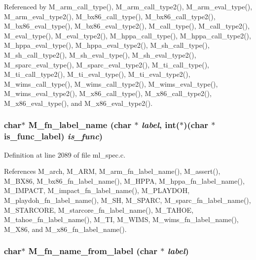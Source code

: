 Referenced by M\_\-arm\_\-call\_\-type(), M\_\-arm\_\-call\_\-type2(), M\_\-arm\_\-eval\_\-type(), M\_\-arm\_\-eval\_\-type2(), M\_\-bx86\_\-call\_\-type(), M\_\-bx86\_\-call\_\-type2(), M\_\-bx86\_\-eval\_\-type(), M\_\-bx86\_\-eval\_\-type2(), M\_\-call\_\-type(), M\_\-call\_\-type2(), M\_\-eval\_\-type(), M\_\-eval\_\-type2(), M\_\-hppa\_\-call\_\-type(), M\_\-hppa\_\-call\_\-type2(), M\_\-hppa\_\-eval\_\-type(), M\_\-hppa\_\-eval\_\-type2(), M\_\-sh\_\-call\_\-type(), M\_\-sh\_\-call\_\-type2(), M\_\-sh\_\-eval\_\-type(), M\_\-sh\_\-eval\_\-type2(), M\_\-sparc\_\-eval\_\-type(), M\_\-sparc\_\-eval\_\-type2(), M\_\-ti\_\-call\_\-type(), M\_\-ti\_\-call\_\-type2(), M\_\-ti\_\-eval\_\-type(), M\_\-ti\_\-eval\_\-type2(), M\_\-wims\_\-call\_\-type(), M\_\-wims\_\-call\_\-type2(), M\_\-wims\_\-eval\_\-type(), M\_\-wims\_\-eval\_\-type2(), M\_\-x86\_\-call\_\-type(), M\_\-x86\_\-call\_\-type2(), M\_\-x86\_\-eval\_\-type(), and M\_\-x86\_\-eval\_\-type2().
\subsubsection{\setlength{\rightskip}{0pt plus 5cm}char$\ast$ M\_\-fn\_\-label\_\-name (char $\ast$ {\em label}, int($\ast$)(char $\ast$is\_\-func\_\-label) {\em is\_\-func})}\label{ml__spec_8c_c708ff0d2cfb43dabe959a6b8851488d}




Definition at line 2089 of file ml\_\-spec.c.

References M\_\-arch, M\_\-ARM, M\_\-arm\_\-fn\_\-label\_\-name(), M\_\-assert(), M\_\-BX86, M\_\-bx86\_\-fn\_\-label\_\-name(), M\_\-HPPA, M\_\-hppa\_\-fn\_\-label\_\-name(), M\_\-IMPACT, M\_\-impact\_\-fn\_\-label\_\-name(), M\_\-PLAYDOH, M\_\-playdoh\_\-fn\_\-label\_\-name(), M\_\-SH, M\_\-SPARC, M\_\-sparc\_\-fn\_\-label\_\-name(), M\_\-STARCORE, M\_\-starcore\_\-fn\_\-label\_\-name(), M\_\-TAHOE, M\_\-tahoe\_\-fn\_\-label\_\-name(), M\_\-TI, M\_\-WIMS, M\_\-wims\_\-fn\_\-label\_\-name(), M\_\-X86, and M\_\-x86\_\-fn\_\-label\_\-name().
\subsubsection{\setlength{\rightskip}{0pt plus 5cm}char$\ast$ M\_\-fn\_\-name\_\-from\_\-label (char $\ast$ {\em label})}\label{ml__spec_8c_941cbbae90c867b67c1f123ba1ffeb7a}




